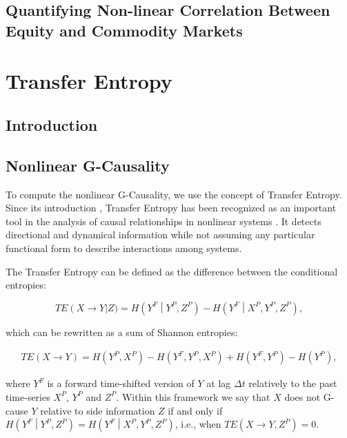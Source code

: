 \documentclass[]{book}
\theoremstyle{definition}
\theoremstyle{definition}
\theoremstyle{definition}
\theoremstyle{remark}
\begin{document}
\section{Quantifying Non-linear Correlation Between Equity and Commodity
Markets}\label{quantifying-non-linear-correlation-between-equity-and-commodity-markets}

\chapter{Transfer Entropy}\label{transfer-entropy}

\section{Introduction}\label{introduction-2}

\section{Nonlinear G-Causality}\label{nonlinearG}

To compute the nonlinear G-Causality, we use the concept of Transfer
Entropy. Since its introduction \citep{PhysRevLett.85.461}, Transfer
Entropy has been recognized as an important tool in the analysis of
causal relationships in nonlinear systems \citep{citeulike:1447442}. It
detects directional and dynamical information
\citep{10.1371/journal.pone.0109462} while not assuming any particular
functional form to describe interactions among systems.

The Transfer Entropy can be defined as the difference between the
conditional entropies:

\begin{equation}
 TE\left(X \rightarrow Y\right \vert Z) =  H\left(Y^F\middle\vert Y^P,Z^P\right) - H\left(Y^F\middle\vert X^P, Y^P,Z^P\right),
\label{eq:TE}
\end{equation}

which can be rewritten as a sum of Shannon entropies:

\begin{align}
TE\left(X \rightarrow Y\right) = H\left(Y^P, X^P\right) - H\left(Y^F, Y^P, X^P\right) + H\left(Y^F, Y^P\right) - H\left(Y^P\right),
\end{align}

where \(Y^F\) is a forward time-shifted version of \(Y\) at lag
\(\Delta t\) relatively to the past time-series \(X^P\), \(Y^P\) and
\(Z^P\). Within this framework we say that \(X\) does not G-cause \(Y\)
relative to side information \(Z\) if and only if
\(H\left(Y^F\middle\vert Y^P,Z^P \right) = H\left(Y^F\middle\vert X^P, Y^P,Z^P\right)\),
i.e., when \(TE\left(X \rightarrow Y,Z^P\right) = 0\).
\end{document}
